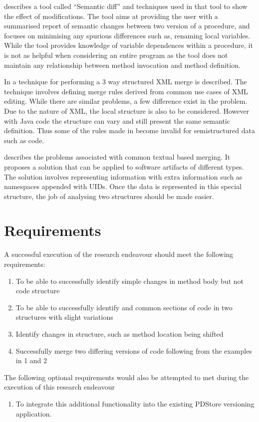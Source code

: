 \documentclass[11pt,twocolumn]{article}
\begin{document}
\cite{SemanticDiff} describes a tool called “Semantic diff” and techniques
used in that tool to show the effect of modifications. The tool aims
at providing the user with a summarised report of semantic changes
between two version of a procedure, and focuses on minimising any
spurious differences such as, renaming local variables. While the
tool provides knowledge of variable dependences within a procedure,
it is not as helpful when considering an entire program as the tool
does not maintain any relationship between method invocation and method
definition.

In \cite{XMLMerge} a technique for performing a 3 way structured
XML merge is described. The technique involves defining merge rules
derived from common use cases of XML editing. While there are similar
problems, a few difference exist in the problem. Due to the nature
of XML, the local structure is also to be considered. However with
Java code the structure can vary and still present the same semantic
definition. Thus some of the rules made in \cite{XMLMerge} become
invalid for semistructured data such as code.

\cite{mergegraph} describes the problems associated with common textual
based merging. It proposes a solution that can be applied to software
artifacts of different types. The solution involves representing information
with extra information such as namespaces appended with UIDs. Once
the data is represented in this special structure, the job of analysing
two structures should be made easier.


\section{Requirements}

A successful execution of the research endeavour should meet the following
requirements: 
\begin{enumerate}
\item To be able to successfully identify simple changes in method body
but not code structure 
\item To be able to successfully identify and common sections of code in
two structures with slight variations 
\item Identify changes in structure, such as method location being shifted 
\item Successfully merge two differing versions of code following from the
examples in 1 and 2
\end{enumerate}
The following optional requirements would also be attempted to met
during the execution of this research endeavour 
\begin{enumerate}
\item To integrate this additional functionality into the existing PDStore
versioning application. 
\end{enumerate}
\end{document}
